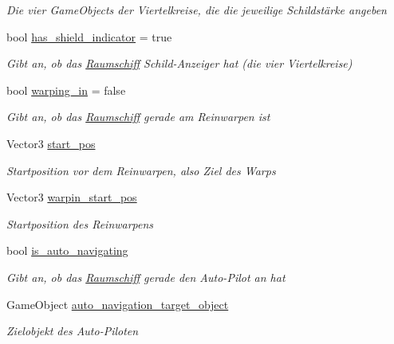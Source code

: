 \begin{DoxyCompactItemize}
\begin{DoxyCompactList}\small\item\em Die vier Game\+Objects der Viertelkreise, die die jeweilige Schildstärke angeben \end{DoxyCompactList}\item 
bool \hyperlink{class_spaceship_afe9aabc5e72224e51baf21791e026bd0}{has\+\_\+shield\+\_\+indicator} = true
\begin{DoxyCompactList}\small\item\em Gibt an, ob das \hyperlink{class_raumschiff}{Raumschiff} Schild-\/\+Anzeiger hat (die vier Viertelkreise) \end{DoxyCompactList}\item 
bool \hyperlink{class_spaceship_a17928c1e3b04001aaf33e9083731c647}{warping\+\_\+in} = false
\begin{DoxyCompactList}\small\item\em Gibt an, ob das \hyperlink{class_raumschiff}{Raumschiff} gerade am Reinwarpen ist \end{DoxyCompactList}\item 
Vector3 \hyperlink{class_spaceship_a55f3116d23628f01925dd1b7f4a053e9}{start\+\_\+pos}
\begin{DoxyCompactList}\small\item\em Startposition vor dem Reinwarpen, also Ziel des Warps \end{DoxyCompactList}\item 
Vector3 \hyperlink{class_spaceship_a1cb2c76d5ed1db05cba652b7a9cd71ca}{warpin\+\_\+start\+\_\+pos}
\begin{DoxyCompactList}\small\item\em Startposition des Reinwarpens \end{DoxyCompactList}\item 
bool \hyperlink{class_spaceship_a6088ab385c31a4133eb7418bc79dd31b}{is\+\_\+auto\+\_\+navigating}
\begin{DoxyCompactList}\small\item\em Gibt an, ob das \hyperlink{class_raumschiff}{Raumschiff} gerade den Auto-\/\+Pilot an hat \end{DoxyCompactList}\item 
Game\+Object \hyperlink{class_spaceship_ad7b81478ac9e68d3b28d84ccda1b0e5f}{auto\+\_\+navigation\+\_\+target\+\_\+object}
\begin{DoxyCompactList}\small\item\em Zielobjekt des Auto-\/\+Piloten \end{DoxyCompactList}\item 

\end{DoxyCompactItemize}

